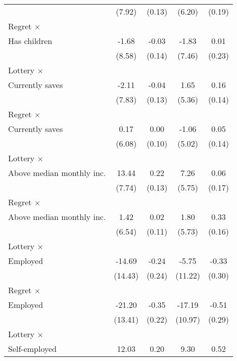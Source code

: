 \begin{table}[htbp]
\begin{tabular}{l*{4}{c}}
                &   (7.92)         &   (0.13)         &   (6.20)         &   (0.19)         \\
\addlinespace
Regret $\times$ \\ Has children&    -1.68         &    -0.03         &    -1.83         &     0.01         \\
                &   (8.58)         &   (0.14)         &   (7.46)         &   (0.23)         \\
\addlinespace
Lottery $\times$ \\ Currently saves&    -2.11         &    -0.04         &     1.65         &     0.16         \\
                &   (7.83)         &   (0.13)         &   (5.36)         &   (0.14)         \\
\addlinespace
Regret $\times$ \\ Currently saves&     0.17         &     0.00         &    -1.06         &     0.05         \\
                &   (6.08)         &   (0.10)         &   (5.02)         &   (0.14)         \\
\addlinespace
Lottery $\times$ \\ Above median monthly inc.&    13.44\sym{*}  &     0.22\sym{*}  &     7.26         &     0.06         \\
                &   (7.74)         &   (0.13)         &   (5.75)         &   (0.17)         \\
\addlinespace
Regret $\times$ \\ Above median monthly inc.&     1.42         &     0.02         &     1.80         &     0.33\sym{**} \\
                &   (6.54)         &   (0.11)         &   (5.73)         &   (0.16)         \\
\addlinespace
Lottery $\times$ \\ Employed&   -14.69         &    -0.24         &    -5.75         &    -0.33         \\
                &  (14.43)         &   (0.24)         &  (11.22)         &   (0.30)         \\
\addlinespace
Regret $\times$ \\ Employed&   -21.20         &    -0.35         &   -17.19         &    -0.51\sym{*}  \\
                &  (13.41)         &   (0.22)         &  (10.97)         &   (0.29)         \\
\addlinespace
Lottery $\times$ \\ Self-employed&    12.03         &     0.20         &     9.30         &     0.52         \\

\end{tabular}
\end{table}
